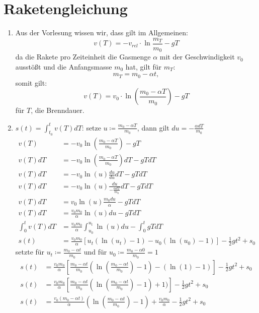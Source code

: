 \documentclass[sectionformat = aufgabe]{gadsescript}
\begin{document}
\section{Raketengleichung}
\begin{enumerate}[label=\alph*)]
	\item Aus der Vorlesung wissen wir, dass gilt im Allgemeinen:\\
		\[ v(T) = - v_{rel} \cdot \ln{\frac{m_T}{m_0}} - gT \]
		da die Rakete pro Zeiteinheit die Gasmenge $\alpha$ mit der Geschwindigkeit $v_0$ ausstößt und die Anfangsmasse $m_0$ hat, gilt für $m_T$:
		\[ m_T = m_0 - \alpha t, \]somit gilt:
		\[ v(T) = v_0 \cdot \ln(\frac{m_0 - \alpha T}{m_0}) - gT \]
		für $T$, die Brenndauer.
	\item $s(t) = \int_{t_0}^{t} v(T) dT$:
		setze $ u \coloneqq \frac{m_0 - \alpha T}{m_0} $, dann gilt $ du = - \frac{\alpha dT}{m_0} $
		\begin{align*}
			v(T) &= - v_0\ln(\frac{m_0 - \alpha T}{m_0}) - gT\\
			v(T)dT &= - v_0\ln(\frac{m_0 - \alpha T}{m_0})dT - gTdT\\
			v(T)dT &= - v_0\ln(u)\frac{du}{du}dT - gTdT\\
			v(T)dT &= - v_0\ln(u)\frac{du}{-\frac{\alpha dT}{m_0}}dT - gTdT\\
			v(T)dT &= v_0\ln(u)\frac{m_0du}{\alpha} - gTdT\\
			v(T)dT &= \frac{v_0m_0}{\alpha}\ln(u)du - gTdT\\
			\int_0^t v(T)dT &= \frac{v_0m_0}{\alpha}\int_{u_0}^{u_t}\ln(u)du - \int_0^t gTdT\\
			s(t) &= \frac{v_0m_0}{\alpha}\left[u_t(\ln(u_t) - 1) - u_0(\ln(u_0) - 1)\right] - \frac{1}{2}gt^2 + s_0
		\end{align*}
		setzte für $u_t \coloneqq \frac{m_0 - \alpha t}{m_0}$ und für $u_0 \coloneqq \frac{m_0 - \alpha 0}{m_0} = 1$%
		\begin{align*}
			s(t) &= \frac{v_0m_0}{\alpha}\left[%
					\frac{m_0 - \alpha t}{m_0}\left(\ln\left(\frac{m_0 - \alpha t}{m_0}\right) - 1\right) - (\ln(1) - 1)%
				\right]%
				- \frac{1}{2}gt^2 + s_0\\
			s(t) &= \frac{v_0m_0}{\alpha}\left[%
					\frac{m_0 - \alpha t}{m_0}\left(\ln\left(\frac{m_0 - \alpha t}{m_0}\right) - 1\right) + 1)%
				\right]%
				- \frac{1}{2}gt^2 + s_0\\
			s(t) &= \frac{v_0(m_0 - \alpha t)}{\alpha}\left(\ln\left(\frac{m_0 - \alpha t}{m_0}\right) - 1\right) + \frac{v_0m_0}{\alpha}%
				- \frac{1}{2}gt^2 + s_0\\

\end{align*}
\end{enumerate}
\end{document}
